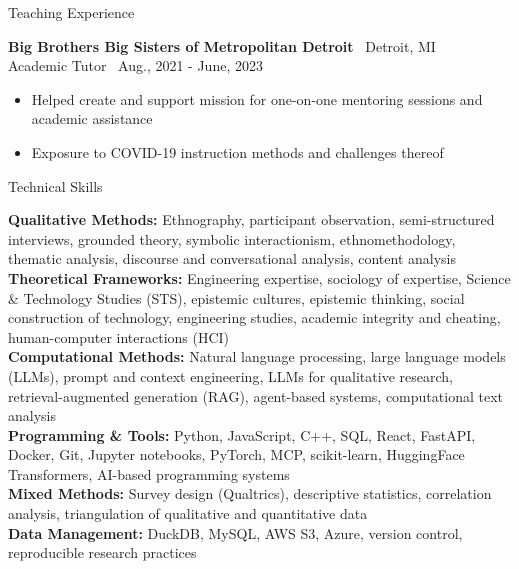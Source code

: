 \documentclass{resume}
\begin{document}
\begin{rSection}{Teaching Experience}

{\bf Big Brothers Big Sisters of Metropolitan Detroit} \hfill {\ {Detroit, MI}}\\
Academic Tutor \hfill {\ Aug., 2021 - June, 2023}
\begin{itemize}
  \item \vspace{-0.5em} Helped create and support mission for one-on-one mentoring sessions and academic assistance \vspace{-0.3em}
  \item \vspace{-0.5em} Exposure to COVID-19 instruction methods and challenges thereof \vspace{-0.3em}
\end{itemize} 

\end{rSection}

\begin{rSection}{Technical Skills}

{\bf Qualitative Methods:} Ethnography, participant observation, semi-structured interviews, grounded theory, symbolic interactionism, ethnomethodology, thematic analysis, discourse and conversational analysis, content analysis\\
{\bf Theoretical Frameworks:} Engineering expertise, sociology of expertise, Science \& Technology Studies (STS), epistemic cultures, epistemic thinking, social construction of technology, engineering studies, academic integrity and cheating, human-computer interactions (HCI)\\
{\bf Computational Methods:} Natural language processing, large language models (LLMs), prompt and context engineering, LLMs for qualitative research, retrieval-augmented generation (RAG), agent-based systems, computational text analysis\\
{\bf Programming \& Tools:} Python, JavaScript, C++, SQL, React, FastAPI, Docker, Git, Jupyter notebooks, PyTorch, MCP, scikit-learn, HuggingFace Transformers, AI-based programming systems \\
{\bf Mixed Methods:} Survey design (Qualtrics), descriptive statistics, correlation analysis, triangulation of qualitative and quantitative data\\
{\bf Data Management:} DuckDB, MySQL, AWS S3, Azure, version control, reproducible research practices

\end{rSection}
\end{document}
